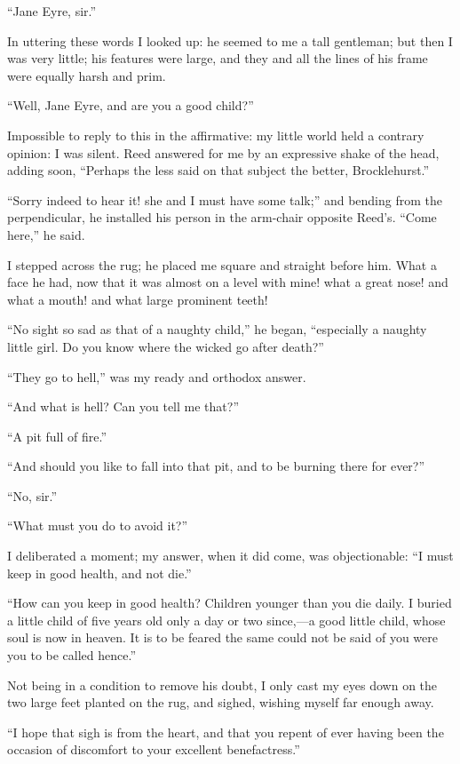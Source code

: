\enquote{Jane Eyre, sir.}

In uttering these words I looked up: he seemed to me a tall gentleman;
but then I was very little; his features were large, and they and all
the lines of his frame were equally harsh and prim.

\enquote{Well, Jane Eyre, and are you a good child?}

Impossible to reply to this in the affirmative: my little world held a
contrary opinion: I was silent. \Mrs{} Reed answered for me by an
expressive shake of the head, adding soon, \enquote{Perhaps the less
	said on that subject the better, \Mr{} Brocklehurst.}

\enquote{Sorry indeed to hear it! she and I must have some talk;} and
bending from the perpendicular, he installed his person in the arm-chair
opposite \Mrs{} Reed's. \enquote{Come here,} he said.

I stepped across the rug; he placed me square and straight before him.
What a face he had, now that it was almost on a level with mine! what a
great nose! and what a mouth! and what large prominent teeth!

\enquote{No sight so sad as that of a naughty child,} he began,
\enquote{especially a naughty little girl. Do you know where the wicked
	go after death?}

\enquote{They go to hell,} was my ready and orthodox answer.

\enquote{And what is hell? Can you tell me that?}

\enquote{A pit full of fire.}

\enquote{And should you like to fall into that pit, and to be burning
	there for ever?}

\enquote{No, sir.}

\enquote{What must you do to avoid it?}

I deliberated a moment; my answer, when it did come, was objectionable:
\enquote{I must keep in good health, and not die.}

\enquote{How can you keep in good health? Children younger than you die
	daily. I buried a little child of five years old only a day or two
	since,---a good little child, whose soul is now in heaven. It is to be
	feared the same could not be said of you were you to be called hence.}

Not being in a condition to remove his doubt, I only cast my eyes down
on the two large feet planted on the rug, and sighed, wishing myself far
enough away.

\enquote{I hope that sigh is from the heart, and that you repent of ever
	having been the occasion of discomfort to your excellent benefactress.}

